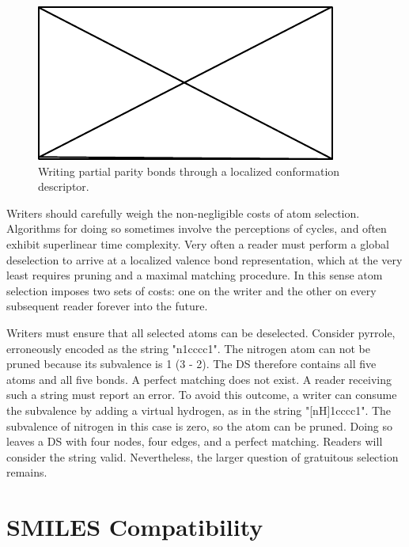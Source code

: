 \documentclass{article}
\begin{document}
\begin{figure}
    \centering
    \includegraphics{filler}
    \caption{Writing partial parity bonds through a localized conformation descriptor.}
    \label{fig:writing-ppb}
\end{figure}

Writers should carefully weigh the non-negligible costs of atom selection. Algorithms for doing so sometimes involve the perceptions of cycles, and often exhibit superlinear time complexity. Very often a reader must perform a global deselection to arrive at a localized valence bond representation, which at the very least requires pruning and a maximal matching procedure. In this sense atom selection imposes two sets of costs: one on the writer and the other on every subsequent reader forever into the future.

Writers must ensure that all selected atoms can be deselected. Consider pyrrole, erroneously encoded as the string "n1cccc1". The nitrogen atom can not be pruned because its subvalence is 1 (3 - 2). The DS therefore contains all five atoms and all five bonds. A perfect matching does not exist. A reader receiving such a string must report an error. To avoid this outcome, a writer can consume the subvalence by adding a virtual hydrogen, as in the string "[nH]1cccc1". The subvalence of nitrogen in this case is zero, so the atom can be pruned. Doing so leaves a DS with four nodes, four edges, and a perfect matching. Readers will consider the string valid. Nevertheless, the larger question of gratuitous selection remains.

\section*{SMILES Compatibility}
\end{document}
